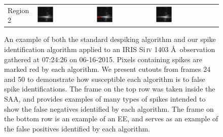 \documentclass[10pt,letterpaper]{article}
\newcommand{\SiIV}{Si\,\textsc{iv} 1403 \AA}
\newcommand{\EE}{\ac{EE}}
\newcommand{\SAA}{\ac{SAA}}
\begin{document}
\begin{figure}[h!]
\begin{tabular}{m{} m{} m{} m{} @{}m{0pt}@{}}
						Region 2 & \includegraphics[width=0.3\textwidth]{fig/orig_2} & \includegraphics[width=0.3\textwidth]{fig/despike_2} & \includegraphics[width=0.3\textwidth]{fig/dspk_2} & \\
					\end{tabular}
					
					\caption{An example of both the standard despiking algorithm and our spike identification algorithm applied to an IRIS \SiIV\ observation gathered at 07:24:26 on 06-16-2015.
						Pixels containing spikes are marked red by each algorithm.
						We present cutouts from frames 24 and 50 to demonstrate how susceptible each algorithm is to false spike identifications. 
						The frame on the top row was taken inside the \SAA, and provides examples of many types of spikes intended to show the false negatives identified by each algorithm.
						The frame on the bottom row is an example of an \EE, and serves as an example of the false positives identified by each algorithm.}
					
					\label{dspk_ex}
					
				\end{figure}
				
\end{document}
